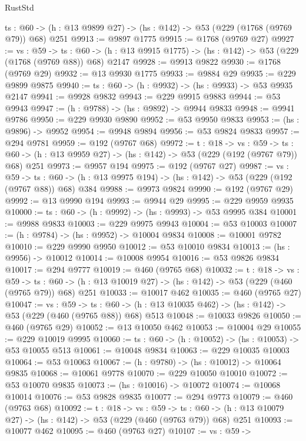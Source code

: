 \begin{lexlean}{RustStd}
\begin{coremodule}
  {ts : @60} -> (h : @13 @9899 @27) -> (hs : @142) -> @53 (@229 (@1768 (@9769 @79)) @68) @251
@9913 := @9897 @1775
@9915 := @1768 (@9769 @27)
@9927 := {vs : @59} ->
  {ts : @60} -> (h : @13 @9915 @1775) -> (hs : @142) -> @53 (@229 (@1768 (@9769 @88)) @68) @2147
@9928 := @9913 @9822
@9930 := @1768 (@9769 @29)
@9932 := @13 @9930 @1775
@9933 := @9884 @29
@9935 := @229 @9899 @9875
@9940 := {ts : @60} -> (h : @9932) -> (hs : @9933) -> @53 @9935 @2147
@9941 := @9928 @9832
@9943 := @229 @9915 @9883
@9944 := @53 @9943
@9947 := (h : @9788) -> (hs : @9892) -> @9944 @9833
@9948 := @9941 @9786
@9950 := @229 @9930 @9890
@9952 := @53 @9950 @9833
@9953 := (hs : @9896) -> @9952
@9954 := @9948 @9894
@9956 := @53 @9824 @9833
@9957 := @294 @9781
@9959 := @192 (@9767 @68)
@9972 := {t : @18} ->
  {vs : @59} ->
  {ts : @60} -> (h : @13 @9959 @27) -> (hs : @142) -> @53 (@229 (@192 (@9767 @79)) @68) @251
@9973 := @9957 @194
@9975 := @192 (@9767 @27)
@9987 := {vs : @59} ->
  {ts : @60} -> (h : @13 @9975 @194) -> (hs : @142) -> @53 (@229 (@192 (@9767 @88)) @68) @384
@9988 := @9973 @9824
@9990 := @192 (@9767 @29)
@9992 := @13 @9990 @194
@9993 := @9944 @29
@9995 := @229 @9959 @9935
@10000 := {ts : @60} -> (h : @9992) -> (hs : @9993) -> @53 @9995 @384
@10001 := @9988 @9833
@10003 := @229 @9975 @9943
@10004 := @53 @10003
@10007 := (h : @9784) -> (hs : @9952) -> @10004 @9834
@10008 := @10001 @9782
@10010 := @229 @9990 @9950
@10012 := @53 @10010 @9834
@10013 := (hs : @9956) -> @10012
@10014 := @10008 @9954
@10016 := @53 @9826 @9834
@10017 := @294 @9777
@10019 := @460 (@9765 @68)
@10032 := {t : @18} ->
  {vs : @59} ->
  {ts : @60} -> (h : @13 @10019 @27) -> (hs : @142) -> @53 (@229 (@460 (@9765 @79)) @68) @251
@10033 := @10017 @462
@10035 := @460 (@9765 @27)
@10047 := {vs : @59} ->
  {ts : @60} -> (h : @13 @10035 @462) -> (hs : @142) -> @53 (@229 (@460 (@9765 @88)) @68) @513
@10048 := @10033 @9826
@10050 := @460 (@9765 @29)
@10052 := @13 @10050 @462
@10053 := @10004 @29
@10055 := @229 @10019 @9995
@10060 := {ts : @60} -> (h : @10052) -> (hs : @10053) -> @53 @10055 @513
@10061 := @10048 @9834
@10063 := @229 @10035 @10003
@10064 := @53 @10063
@10067 := (h : @9780) -> (hs : @10012) -> @10064 @9835
@10068 := @10061 @9778
@10070 := @229 @10050 @10010
@10072 := @53 @10070 @9835
@10073 := (hs : @10016) -> @10072
@10074 := @10068 @10014
@10076 := @53 @9828 @9835
@10077 := @294 @9773
@10079 := @460 (@9763 @68)
@10092 := {t : @18} ->
  {vs : @59} ->
  {ts : @60} -> (h : @13 @10079 @27) -> (hs : @142) -> @53 (@229 (@460 (@9763 @79)) @68) @251
@10093 := @10077 @462
@10095 := @460 (@9763 @27)
@10107 := {vs : @59} ->

\end{coremodule}
\end{lexlean}
